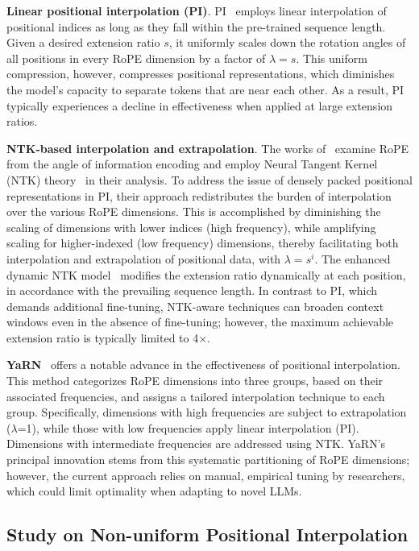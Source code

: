 \textbf{Linear positional interpolation (PI)}. PI~\cite{pi} employs linear interpolation of positional indices as long as they fall within the pre-trained sequence length. Given a desired extension ratio $s$, it uniformly scales down the rotation angles of all positions in every RoPE dimension by a factor of $\lambda = s$. This uniform compression, however, compresses positional representations, which diminishes the model’s capacity to separate tokens that are near each other. As a result, PI typically experiences a decline in effectiveness when applied at large extension ratios.

\textbf{NTK-based interpolation and extrapolation}. The works of~\cite{ntk,dynamicntk} examine RoPE from the angle of information encoding and employ Neural Tangent Kernel (NTK) theory~\cite{jacot2018neural,tancik2020fourier} in their analysis. To address the issue of densely packed positional representations in PI, their approach redistributes the burden of interpolation over the various RoPE dimensions. This is accomplished by diminishing the scaling of dimensions with lower indices (high frequency), while amplifying scaling for higher-indexed (low frequency) dimensions, thereby facilitating both interpolation and extrapolation of positional data, with $\lambda=s^{i}$. The enhanced dynamic NTK model~\cite{dynamicntk} modifies the extension ratio dynamically at each position, in accordance with the prevailing sequence length. In contrast to PI, which demands additional fine-tuning, NTK-aware techniques can broaden context windows even in the absence of fine-tuning; however, the maximum achievable extension ratio is typically limited to 4$\times$.

\textbf{YaRN}~\cite{yarn} offers a notable advance in the effectiveness of positional interpolation. This method categorizes RoPE dimensions into three groups, based on their associated frequencies, and assigns a tailored interpolation technique to each group. Specifically, dimensions with high frequencies are subject to extrapolation ($\lambda$=1), while those with low frequencies apply linear interpolation (PI). Dimensions with intermediate frequencies are addressed using NTK. YaRN's principal innovation stems from this systematic partitioning of RoPE dimensions; however, the current approach relies on manual, empirical tuning by researchers, which could limit optimality when adapting to novel LLMs.

\subsection{Study on Non-uniform Positional Interpolation}

